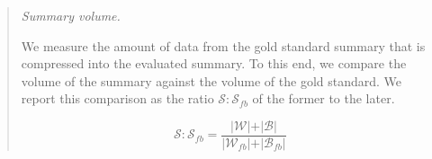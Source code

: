 \begin{quotation}
	\item[\emph{Summary volume.}]


%	
%	
%	
%	


	We measure the amount of data from the gold standard summary that is compressed into the evaluated summary. To this end, we compare the volume of the summary against the volume of the gold standard. We report this comparison as the ratio  $\mathcal{S}:\mathcal{S}_{fb}$ of the former to the later.
	
	$$
	\mathcal{S}:\mathcal{S}_{fb} = \frac{\vert \mathcal{W} \vert + \vert \mathcal{B} \vert}{\vert \mathcal{W}_{fb} \vert + \vert \mathcal{B}_{fb} \vert}
	$$
	

\end{quotation}
